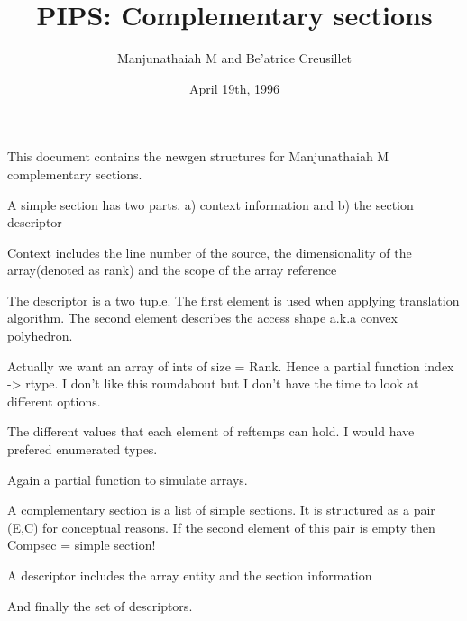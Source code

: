\documentclass[a4paper]{article}
\title{PIPS: Complementary sections}
\author{Manjunathaiah M and Be'atrice Creusillet}
\date{April 19th, 1996}
\begin{document}
\sloppy

This document contains the newgen structures for Manjunathaiah M
complementary sections.

{}

{}
{}

{}
A simple section has two parts. a) context information and 
b) the section descriptor

{}
Context includes the line number of the source, the dimensionality
of the array(denoted as rank) and the scope of the array reference

{}
The descriptor is a two tuple. The first element is used when
applying translation algorithm. The second element describes
the access shape a.k.a convex polyhedron.

{}
Actually we want an array of ints of size = Rank. Hence a partial
function index -> rtype. I don't like this roundabout but I don't
have the time to look at different options. 

{}
The different values that each element of reftemps can hold.
I would have prefered enumerated types.

{}
Again a partial function to simulate arrays.

{}
A complementary section is a list of simple sections.
It is structured as a pair (E,{C}) for conceptual reasons.
If the second element of this pair is empty then Compsec = simple section!

{}
A descriptor includes the array entity and the section information

{}
And finally the set of descriptors.
\end{document}
